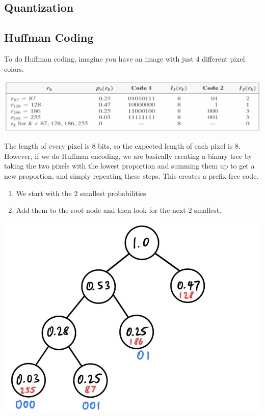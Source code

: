 \documentclass{article}
\begin{document}
  \subsection{Quantization}

  \subsection{Huffman Coding}

    To do Huffman coding, imagine you have an image with just 4 different pixel colors. 
    \begin{center}
        \includegraphics[scale=0.25]{img/pixels_huffman.png}
    \end{center}
    The length of every pixel is $8$ bits, so the expected length of each pixel is $8$. However, if we do Huffman encoding, we are basically creating a binary tree by taking the two pixels with the lowest proportion and summing them up to get a new proportion, and simply repeating these steps. This creates a prefix free code. 
    \begin{enumerate}
        \item We start with the 2 smallest probabilities 
        \item Add them to the root node and then look for the next 2 smallest. 
    \end{enumerate}
    \begin{center}
        \includegraphics[scale=0.25]{img/huffman.png}
    \end{center}
\end{document}
